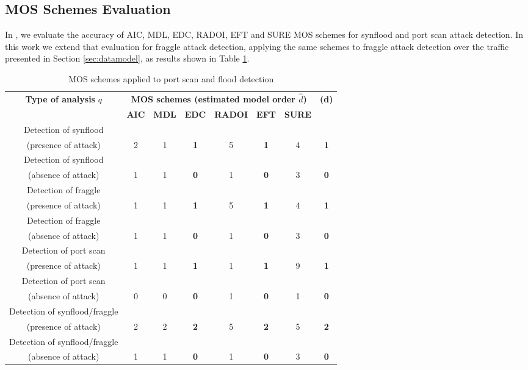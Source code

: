 \documentclass[review]{elsarticle}
\begin{document}
\subsection{MOS Schemes Evaluation}
\label{sec:MOSSchemesEvaluation}

In \cite{tenorio2013greatest}, we evaluate the accuracy of AIC, MDL, EDC, RADOI, EFT and SURE MOS schemes \cite{da2009comparison,tenorio2013greatest} for synflood and port scan attack detection. In this work we extend that evaluation for fraggle attack detection, applying the same schemes to fraggle attack detection over the traffic presented in Section \ref{sec:datamodel}, as results shown in Table \ref{tab:tab4}.

\begin{table}[h!]
  \centering
  \scriptsize
  \caption{MOS schemes applied to port scan and flood detection}
  \label{tab:tab4}
  \begin{tabular}{ c c c c c c c c }
	\toprule
	\multirow{2}{*}{\textbf{Type of analysis} $q$} &\multicolumn{6}{c}{\textbf{MOS schemes (estimated model order $\hat{d}$)}} &{\textbf{(d)}}\\ 
			\hhline{~------~}
		&\textbf{AIC} &\textbf{MDL} &\textbf{EDC} &\textbf{RADOI} &\textbf{EFT} &\textbf{SURE}\\
	\midrule
	Detection of synflood \\(presence of attack) &2 &1 &\textbf{1} &5 &\textbf{1} &4 &\textbf{1} \\
	Detection of synflood \\(absence of attack) &1 &1 &\textbf{0} &1 &\textbf{0} &3 &\textbf{0} \\
	\midrule
	Detection of fraggle \\(presence of attack) &1 &1 &\textbf{1} &5 &\textbf{1} &4 &\textbf{1} \\
	Detection of fraggle \\(absence of attack) &1 &1 &\textbf{0} &1 &\textbf{0} &3 &\textbf{0} \\
	\midrule
	Detection of port scan \\(presence of attack) &1 &1 &\textbf{1} &1 &\textbf{1} &9 &\textbf{1} \\
	Detection of port scan \\(absence of attack) &0 &0 &\textbf{0} &1 &\textbf{0} &1 &\textbf{0} \\
	\midrule
	Detection of synflood/fraggle \\(presence of attack) &2 &2 &\textbf{2} &5 &\textbf{2} &5 &\textbf{2} \\
	Detection of synflood/fraggle \\(absence of attack) &1 &1 &\textbf{0} &1 &\textbf{0} &3 &\textbf{0} \\
    \bottomrule
  \end{tabular}
\end{table}
\end{document}

